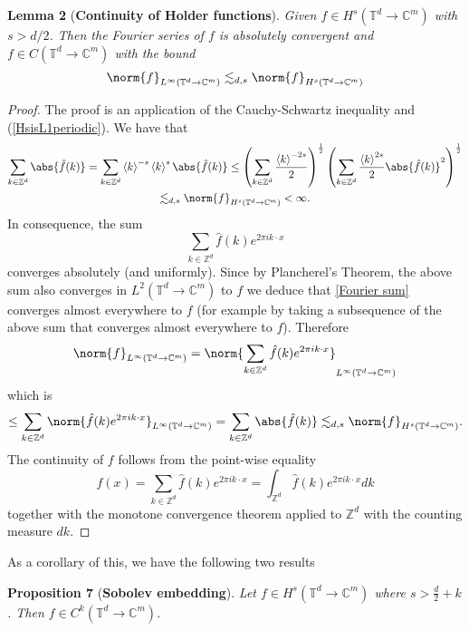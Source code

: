 \documentclass[
]{article}
\begin{document}
\textbf{Lemma 2} (\textbf{Continuity of Holder functions}). \emph{Given
\(f\in H^{s}({\mathbb T}^d\to\mathbb{C}^m)\) with \(s>d/2\). Then the
Fourier series of \(f\) is absolutely convergent and
\(f\in C({\mathbb T}^d\to\mathbb{C}^m)\) with the bound
\[\norm{f}_{L^\infty({\mathbb T}^d\to\mathbb{C}^m)}\lesssim_{d,s}\norm{f}_{H^s({\mathbb T}^d\to\mathbb{C}^m)}\]}

\emph{Proof.} The proof is an application of the Cauchy-Schwartz
inequality and
(\protect\hyperlink{HsisL1periodic}{{[}HsisL1periodic{]}}). We have that
\[\begin{gathered}
        \sum_{k\in{\mathbb Z}^d}\abs{\hat{f}(k)}=\sum_{k\in{\mathbb Z}^d} \left\langle k\right\rangle^{-s}\left\langle k\right\rangle^{s}\abs{\hat{f}(k)}\leq\left(\sum_{k\in{\mathbb Z}^d} \frac{\left\langle k\right\rangle^{-2s}}{2}\right)^{\frac{1}{2}}\left(\sum_{k\in{\mathbb Z}^d}\frac{\left\langle k\right\rangle^{2s}}{2}\abs{\hat{f}(k)}^2\right)^{\frac{1}{2}}\\
        \lesssim_{d,s}\norm{f}_{H^s(\mathbb{T}^d\to\mathbb{C}^m)}<\infty.
    \end{gathered}\] In consequence, the sum \[\label{Fourier sum}
        \sum_{k\in{\mathbb Z}^d}\hat{f}(k)e^{2\pi ik\cdot x}\] converges
absolutely (and uniformly). Since by Plancherel's Theorem, the above sum
also converges in \(L^2({\mathbb T}^d\to\mathbb{C}^m)\) to \(f\) we
deduce that \protect\hyperlink{Fourierux20sum}{{[}Fourier sum{]}}
converges almost everywhere to \(f\) (for example by taking a
subsequence of the above sum that converges almost everywhere to \(f\)).
Therefore
\[\norm{f}_{L^\infty({\mathbb T}^d\to\mathbb{C}^m)}=\norm{\sum_{k\in{\mathbb Z}^d}\hat{f}(k)e^{2\pi ik\cdot x}}_{L^\infty({\mathbb T}^d\to\mathbb{C}^m)}\]
which is
\[\leq\sum_{k\in{\mathbb Z}^d}\norm{\hat{f}(k)e^{2\pi ik\cdot x}}_{L^\infty({\mathbb T}^d\to\mathbb{C}^m)}=\sum_{k\in{\mathbb Z}^d}\abs{\hat{f}(k)}\lesssim_{d,s}\norm{f}_{H^s({\mathbb T}^d\to\mathbb{C}^m)}.\]
The continuity of \(f\) follows from the point-wise equality
\[\label{pointwise convergence Fourier sum}
        f(x)=\sum_{k\in{\mathbb Z}^d}\hat{f}(k)e^{2\pi ik\cdot x}=\int_{{\mathbb Z}^d} \hat{f}(k)e^{2\pi ik\cdot x} dk\]
together with the monotone convergence theorem applied to
\({\mathbb Z}^d\) with the counting measure \(dk\).~◻

As a corollary of this, we have the following two results

\leavevmode{}%
\textbf{Proposition 7} (\textbf{Sobolev embedding}). \emph{Let
\(f\in H^s({\mathbb T}^d\to\mathbb{C}^m)\) where \(s>\frac{d}{2}+k\).
Then \(f\in C^k({\mathbb T}^d\to\mathbb{C}^m)\).}
\end{document}
